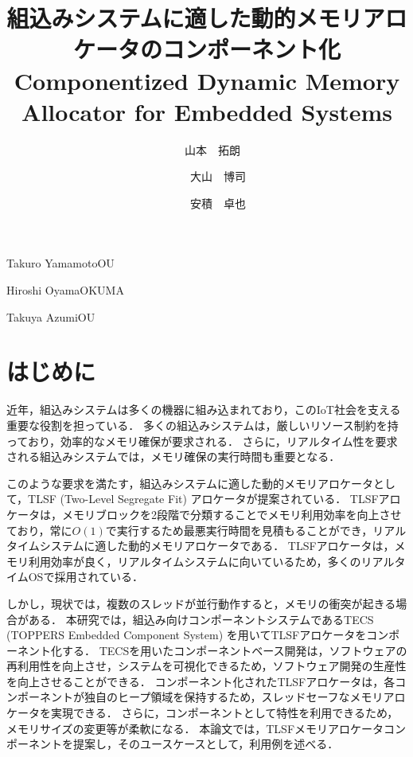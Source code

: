 \documentclass[submit,techrep]{ipsj_v2/UTF8/ipsj}
\begin{document}
\title{
    {\Huge 組込みシステムに適した動的メモリアロケータのコンポーネント化}
  \\{\huge Componentized Dynamic Memory Allocator for Embedded Systems}
}

\etitle{\vspace{-3.5cm}}



\author{　{\LARGE 山本　拓朗}}{{\Large Takuro Yamamoto}}{OU}%
\author{　　{\LARGE 大山　博司}}{{\Large Hiroshi Oyama}}{OKUMA}%
\author{　　{\LARGE 安積　卓也}}{{\Large Takuya Azumi}}{OU}%

\maketitle

\section{はじめに}

近年，組込みシステムは多くの機器に組み込まれており，このIoT社会を支える重要な役割を担っている\cite{par:IoTIndustries}\cite{par:IoTComputing}．
多くの組込みシステムは，厳しいリソース制約を持っており，効率的なメモリ確保が要求される．
さらに，リアルタイム性を要求される組込みシステムでは，メモリ確保の実行時間も重要となる．

このような要求を満たす，組込みシステムに適した動的メモリアロケータとして，TLSF (Two-Level Segregate Fit) アロケータが提案されている\cite{par:TLSF}\cite{url:TLSF}．
TLSFアロケータは，メモリブロックを2段階で分類することでメモリ利用効率を向上させており，常に$O(1)$で実行するため最悪実行時間を見積もることができ，リアルタイムシステムに適した動的メモリアロケータである．
TLSFアロケータは，メモリ利用効率が良く，リアルタイムシステムに向いているため，多くのリアルタイムOSで採用されている．

しかし，現状では，複数のスレッドが並行動作すると，メモリの衝突が起きる場合がある．
本研究では，組込み向けコンポーネントシステムであるTECS (TOPPERS Embedded Component System)\cite{url:TECS}\cite{par:TECS} を用いてTLSFアロケータをコンポーネント化する．
TECSを用いたコンポーネントベース開発は，ソフトウェアの再利用性を向上させ，システムを可視化できるため，ソフトウェア開発の生産性を向上させることができる．
コンポーネント化されたTLSFアロケータは，各コンポーネントが独自のヒープ領域を保持するため，スレッドセーフなメモリアロケータを実現できる．
さらに，コンポーネントとして特性を利用できるため，メモリサイズの変更等が柔軟になる．
本論文では，TLSFメモリアロケータコンポーネントを提案し，そのユースケースとして，利用例を述べる．
\end{document}
